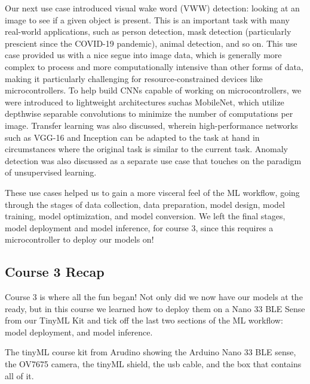 Our next use case introduced visual wake word (VWW) detection: looking at an image to see if a given object is present. This is an important task with many real-world applications, such as person detection, mask detection (particularly prescient since the COVID-19 pandemic), animal detection, and so on. This use case provided us with a nice segue into image data, which is generally more complex to process and more computationally intensive than other forms of data, making it particularly challenging for resource-constrained devices like microcontrollers. To help build CNNs capable of working on microcontrollers, we were introduced to lightweight architectures suchas MobileNet, which utilize depthwise separable convolutions to minimize the number of computations per image. Transfer learning was also discussed, wherein high-performance networks such as VGG-16 and Inception can be adapted to the task at hand in circumstances where the original task is similar to the current task. Anomaly detection was also discussed as a separate use case that touches on the paradigm of unsupervised learning.

These use cases helped us to gain a more visceral feel of the ML workflow, going through the stages of data collection, data preparation, model design, model training, model optimization, and model conversion. We left the final stages, model deployment and model inference, for course 3, since this requires a microcontroller to deploy our models on!

\subsection{Course 3 Recap}

Course 3 is where all the fun began! Not only did we now have our models at the ready, but in this course we learned how to deploy them on a Nano 33 BLE Sense from our TinyML Kit and tick off the last two sections of the ML workflow: model deployment, and model inference.



The tinyML course kit from Arudino showing the Arduino Nano 33 BLE sense, the OV7675 camera, the tinyML shield, the usb cable, and the box that contains all of it.

